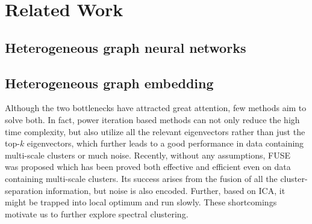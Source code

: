 \section{Related Work}
\label{sec:related}
\subsection{Heterogeneous graph neural networks}
\subsection{Heterogeneous graph embedding}
Although the two bottlenecks have attracted great attention,
few methods aim to solve both.
In fact, power iteration based methods can
not only reduce the high time complexity,
but also utilize all the relevant eigenvectors rather than just the top-$k$ eigenvectors,
which further leads to a good performance in
data containing multi-scale clusters or much noise.
Recently, without any assumptions, 
FUSE~\cite{ye2016fuse} was proposed 
which has been proved both effective and efficient even on data containing multi-scale clusters.
Its success arises from the fusion of all the cluster-separation information,
but noise is also encoded. Further, based on ICA, it might be trapped into local optimum
and run slowly. These shortcomings motivate us to further explore spectral clustering.
















